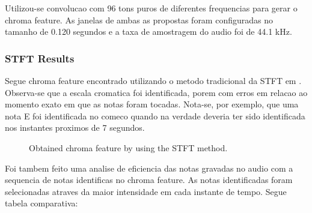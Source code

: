 \documentclass{article}
\begin{document}
	Utilizou-se convolucao com 96 tons puros de diferentes frequencias para gerar o chroma feature. As janelas de ambas as propostas foram configuradas no tamanho de 0.120 segundos e a taxa de amostragem do audio foi de 44.1 kHz.

	\subsubsection{STFT Results}
	Segue chroma feature encontrado utilizando o metodo tradicional da STFT em . Observa-se que a escala cromatica foi identificada, porem com erros em relacao ao momento exato em que as notas foram tocadas. Nota-se, por exemplo, que uma nota E foi identificada no comeco quando na verdade deveria ter sido identificada nos instantes proximos de 7 segundos.

	
	\begin{figure}[h]
	 \centerline{}
	 \caption{Obtained chroma feature by using the STFT method.}
	 \label{fig:1-ssft}
	\end{figure}	

	
	Foi tambem feito uma analise de eficiencia das notas gravadas no audio com a sequencia de notas identificas no chroma feature. As notas identificadas foram selecionadas atraves da maior intensidade em cada instante de tempo. Segue tabela comparativa:
\end{document}
